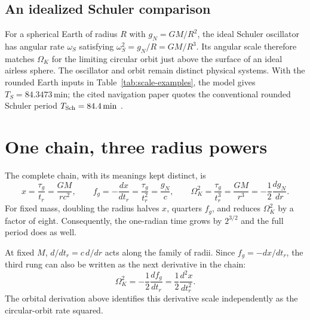 \documentclass[12pt]{article}
\begin{document}
\subsection{An idealized Schuler comparison}

For a spherical Earth of radius $R$ with $g_N=GM/R^2$, the ideal Schuler oscillator has angular rate $\omega_S$ satisfying $\omega_S^2=g_N/R=GM/R^3$. Its angular scale therefore matches $\Omega_K$ for the limiting circular orbit just above the surface of an ideal airless sphere. The oscillator and orbit remain distinct physical systems. With the rounded Earth inputs in Table~\ref{tab:scale-examples}, the model gives $T_S=84.3473\,\mathrm{min}$; the cited navigation paper quotes the conventional rounded Schuler period $T_{\rm Sch}=84.4\,\mathrm{min}$ \cite{OliverGower}.

\section{One chain, three radius powers}
\label{sec:radius-powers}

The complete chain, with its meanings kept distinct, is
\begin{equation}
  \boxed{
  x=\frac{\tau_g}{t_r}=\frac{GM}{rc^2},
  \qquad
  f_g=-\frac{dx}{dt_r}=\frac{\tau_g}{t_r^2}=\frac{g_N}{c},
  \qquad
  \Omega_K^2=\frac{\tau_g}{t_r^3}=\frac{GM}{r^3}
  =-\frac12\frac{dg_N}{dr}.}
  \label{eq:three-rungs}
\end{equation}
For fixed mass, doubling the radius halves $x$, quarters $f_g$, and reduces $\Omega_K^2$ by a factor of eight. Consequently, the one-radian time grows by $2^{3/2}$ and the full period does as well.

At fixed $M$, $d/dt_r=c\,d/dr$ acts along the family of radii. Since $f_g=-dx/dt_r$, the third rung can also be written as the next derivative in the chain:
\begin{equation}
  \Omega_K^2
  =-\frac12\frac{df_g}{dt_r}
  =\frac12\frac{d^2x}{dt_r^2}.
  \label{eq:derivative-ladder}
\end{equation}
The orbital derivation above identifies this derivative scale independently as the circular-orbit rate squared.
\end{document}
